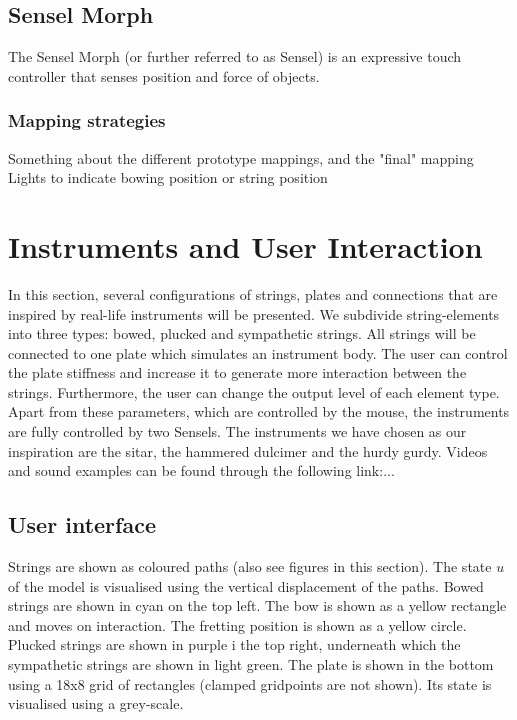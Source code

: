 \documentclass{article}
\begin{document}
\subsection{Sensel Morph}
The Sensel Morph (or further referred to as Sensel) is an expressive touch controller that senses position and force of objects.
\subsubsection{Mapping strategies}
Something about the different prototype mappings, and the "final" mapping 
Lights to indicate bowing position or string position   


\section{Instruments and User Interaction}\label{sec:instruments}
In this section, several configurations of strings, plates and connections that are inspired by real-life instruments will be presented. We subdivide string-elements into three types: bowed, plucked and sympathetic strings. All strings will be connected to one plate which simulates an instrument body. The user can control the plate stiffness and increase it to generate more interaction between the strings. Furthermore, the user can change the output level of each element type. Apart from these parameters, which are controlled by the mouse, the instruments are fully controlled by two Sensels. The instruments we have chosen as our inspiration are the sitar, the hammered dulcimer and the hurdy gurdy. Videos and sound examples can be found through the following link:...

\subsection{User interface}
Strings are shown as coloured paths (also see figures in this section). The state $u$ of the model is visualised using the vertical displacement of the paths. Bowed strings are shown in cyan on the top left. The bow is shown as a yellow rectangle and moves on interaction. The fretting position is shown as a yellow circle. Plucked strings are shown in purple i the top right, underneath which the sympathetic strings are shown in light green. The plate is shown in the bottom using a 18x8 grid of rectangles (clamped gridpoints are not shown). Its state is visualised using a grey-scale.
\end{document}
